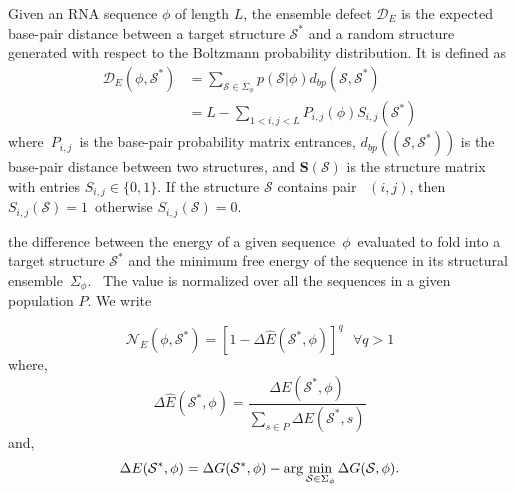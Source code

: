 \begin{mydef}
	\label{def:ed}
	Given an \ac{RNA} sequence $\phi$ of length $L$, the ensemble defect $\mathcal{D}_E$ is the expected base-pair distance between a target structure $\mathcal{S}^*$  and a random structure generated with respect to the Boltzmann probability distribution. It is defined as 
	\begin{equation}
	\label{ed}
	\begin{split}
	\mathcal{D}_E(\phi, \mathcal{S}^*) 
	&= \sum_{\mathcal{S} \in \Sigma_{\phi}}{p(\mathcal{S}|\phi)d_{bp}(\mathcal{S},\mathcal{S}^*)}\\
	&= L - \sum_{1<i,j<L} P_{i,j}(\phi)S_{i,j}(\mathcal{S}^*)
	\end{split}
	\end{equation}
where~\(P_{i,j}\)~is the base-pair probability matrix entrances, $d_{bp} ((\mathcal{S},\mathcal{S}^*))$ is the base-pair distance between two structures, and \(\mathbf{S}(\mathcal{S})\) is the structure matrix with entries \(S_{i,j} \in  \{ 0, 1\}\). If the structure \(\mathcal{S}\) contains pair~ $(i ,j)$, then \(S_{i,j}(\mathcal{S}) = 1\)~otherwise \(S_{i,j}(\mathcal{S}) = 0\).
\end{mydef}

\begin{mydef}[\ac{NED}]
	\label{def:ned}
	the difference between
	the energy of a given sequence~\(\phi\)~evaluated to fold into a target structure $\mathcal{S}^*$ and the minimum free energy of the sequence in its structural ensemble~\(\Sigma_{\phi}\).~ The value is normalized over all the sequences in a given population $P$.  We write
	
	
	\begin{equation}
	\label{ned}
	\mathcal{N}_E (\phi, \mathcal{S}^*) = [1-\Delta \hat{E}(\mathcal{S}^*,\phi)]^q \text{   } \forall q>1
	\end{equation}
	where,
	\begin{equation}
	\Delta \hat{E}(\mathcal{S}^*, \phi) = \frac{\Delta E(\mathcal{S}^*, \phi) }{\sum_{s \in P}{\Delta E(\mathcal{S}^*, s)}}
	\end{equation}
	and,
	\begin{equation}
	\Delta E(\mathcal{S}^*,\phi) = \Delta G(\mathcal{S}^*, \phi) - \arg \min_{\mathcal{S} \in \Sigma_{\phi\\
	}} \Delta G(\mathcal{S}, \phi).
	\end{equation}
	
\end{mydef}


